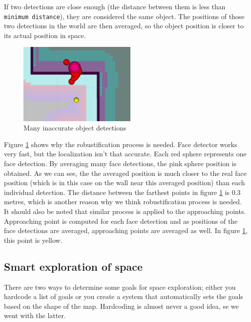 \documentclass[12pt,a4paper]{article}
\begin{document}
	If two detections are close enough (the distance between them is less than \texttt{minimum distance}), they are considered the same object. The positions of those two detections in the world are then averaged, so the object position is closer to its actual position in space.
	
	\begin{figure}[h]
		\centering
		\includegraphics[height=4cm]{images/detections}
		\caption{Many inaccurate object detections}
		\label{fig:inaccurate_detections}
	\end{figure}

	Figure \ref{fig:inaccurate_detections} shows why the robustification process is needed. Face detector works very fast, but the localization isn't that accurate. Each red sphere represents one face detection. By averaging many face detections, the pink sphere position is obtained. As we can see, the the averaged position is much closer to the real face position (which is in this case on the wall near this averaged position) than each individual detection. The distance between the farthest points in figure \ref{fig:inaccurate_detections} is 0.3 metres, which is another reason why we think robustification process is needed. \\
	
	It should also be noted that similar process is applied to the approaching points. Approaching point is computed for each face detection and as positions of the face detections are averaged, approaching points are averaged as well. In figure \ref{fig:inaccurate_detections}, this point is yellow. \\
		
	\subsection{Smart exploration of space} \label{smart_exploration}
	There are two ways to determine some goals for space exploration; either you hardcode a list of goals or you create a system that automatically sets the goals based on the shape of the map. Hardcoding is almost never a good idea, se we went with the latter. \\
\end{document}

